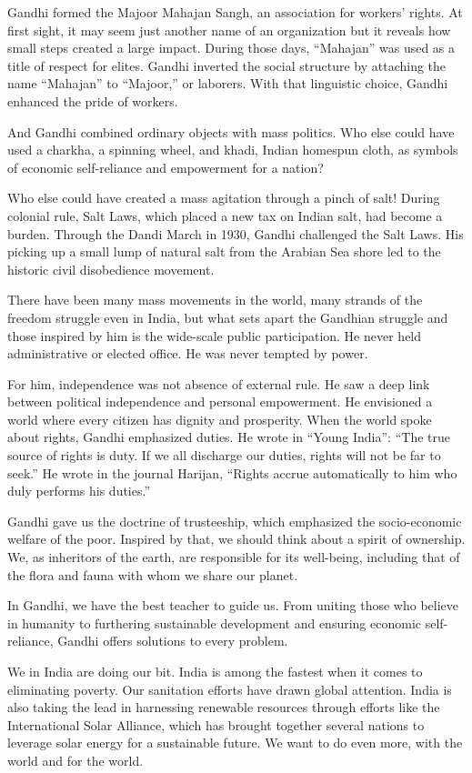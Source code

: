 Gandhi formed the Majoor Mahajan Sangh, an association for workers'
rights. At first sight, it may seem just another name of an organization
but it reveals how small steps created a large impact. During those
days, ``Mahajan'' was used as a title of respect for elites. Gandhi
inverted the social structure by attaching the name ``Mahajan'' to
``Majoor,'' or laborers. With that linguistic choice, Gandhi enhanced
the pride of workers.

And Gandhi combined ordinary objects with mass politics. Who else could
have used a charkha, a spinning wheel, and khadi, Indian homespun cloth,
as symbols of economic self-reliance and empowerment for a nation?

Who else could have created a mass agitation through a pinch of salt!
During colonial rule, Salt Laws, which placed a new tax on Indian salt,
had become a burden. Through the Dandi March in 1930, Gandhi challenged
the Salt Laws. His picking up a small lump of natural salt from the
Arabian Sea shore led to the historic civil disobedience movement.

There have been many mass movements in the world, many strands of the
freedom struggle even in India, but what sets apart the Gandhian
struggle and those inspired by him is the wide-scale public
participation. He never held administrative or elected office. He was
never tempted by power.

For him, independence was not absence of external rule. He saw a deep
link between political independence and personal empowerment. He
envisioned a world where every citizen has dignity and prosperity. When
the world spoke about rights, Gandhi emphasized duties. He wrote in
``Young India'': ``The true source of rights is duty. If we all
discharge our duties, rights will not be far to seek.'' He wrote in the
journal Harijan, ``Rights accrue automatically to him who duly performs
his duties.''

Gandhi gave us the doctrine of trusteeship, which emphasized the
socio-economic welfare of the poor. Inspired by that, we should think
about a spirit of ownership. We, as inheritors of the earth, are
responsible for its well-being, including that of the flora and fauna
with whom we share our planet.

In Gandhi, we have the best teacher to guide us. From uniting those who
believe in humanity to furthering sustainable development and ensuring
economic self-reliance, Gandhi offers solutions to every problem.

We in India are doing our bit. India is among the fastest when it comes
to eliminating poverty. Our sanitation efforts have drawn global
attention. India is also taking the lead in harnessing renewable
resources through efforts like the International Solar Alliance, which
has brought together several nations to leverage solar energy for a
sustainable future. We want to do even more, with the world and for the
world.

